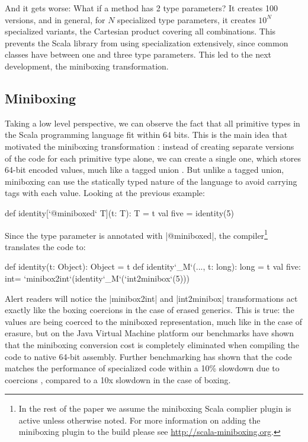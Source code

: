 And it gets worse: What if a method has 2 type parameters? It creates 100 versions, and in general, for $N$ specialized type parameters, it creates $10^N$ specialized variants, the Cartesian product covering all combinations. This prevents the Scala library from using specialization extensively, since common classes have between one and three type parameters. This led to the next development, the miniboxing transformation.

\subsection{Miniboxing}

Taking a low level perspective, we can observe the fact that all primitive types in the Scala programming language fit within 64 bits. This is the main idea that motivated the miniboxing transformation \cite{miniboxing}: instead of creating separate versions of the code for each primitive type alone, we can create a single one, which stores 64-bit encoded values, much like a tagged union \cite{tagged-unions-lua}. But unlike a tagged union, miniboxing can use the statically typed nature of the language to avoid carrying tags with each value. Looking at the previous example:

\begin{lstlisting-nobreak}
 def identity[`@miniboxed` T](t: T): T = t
 val five = identity(5)
\end{lstlisting-nobreak}

Since the type parameter is annotated with |@miniboxed|, the compiler\footnote{In the rest of the paper we assume the miniboxing Scala complier plugin is active unless otherwise noted. For more information on adding the miniboxing plugin to the build please see \url{http://scala-miniboxing.org}.} translates the code to:

\begin{lstlisting-nobreak}
 def identity(t: Object): Object = t
 def identity`_M`(..., t: long): long = t
 val five: int= `minibox2int`(identity`_M`(`int2minibox`(5)))
\end{lstlisting-nobreak}

Alert readers will notice the |minibox2int| and |int2minibox| transformations act exactly like the boxing coercions in the case of erased generics. This is true: the values are being coerced to the miniboxed representation, much like in the case of erasure, but on the Java Virtual Machine platform our benchmarks have shown that the miniboxing conversion cost is completely eliminated when compiling the code to native 64-bit assembly. Further benchmarking has shown that the code matches the performance of specialized code within a 10\% slowdown due to coercions \cite{miniboxing}, compared to a 10x slowdown in the case of boxing.

